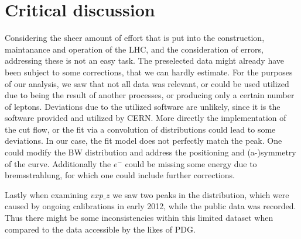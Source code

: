 \documentclass[11 pt]{article}
\begin{document}
\section{Critical discussion}
Considering the sheer amount of effort that is put into the construction, maintanance and operation of the LHC, and the consideration of errors, addressing these is not an easy task. The preselected data might already have been subject to some corrections, that we can hardly estimate. For the purposes of our analysis, we saw that not all data was relevant, or could be used utilized due to being the result of another processes, or producing only a certain number of leptons. 
Deviations due to the utilized software are unlikely, since it is the software  provided and utilized by CERN. More directly the implementation of the cut flow, or the fit via a convolution of distributions could lead to some deviations. In our case,  the fit model does not perfectly match the peak. One could modify the BW distribution and address the positioning and (a-)symmetry of the curve.
Additionally the $e^-$ could be missing some energy due to bremsstrahlung, for which one could include further corrections.

Lastly when examining $vxp\_z$ we saw two peaks in the distribution, which were caused by ongoing calibrations in early 2012, while the public data was recorded. Thus there might be some inconsistencies within this limited dataset when compared to the data accessible by the likes of PDG.
\end{document}
